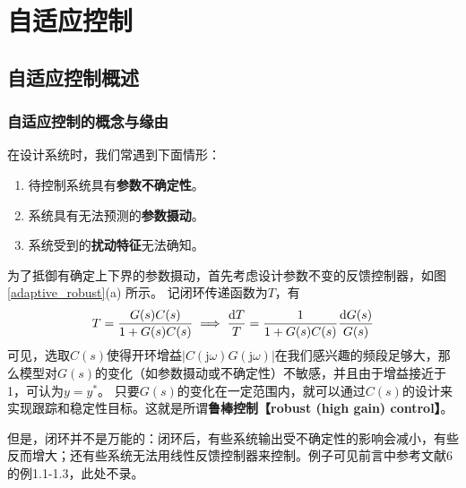 \chapter{自适应控制}\label{cp4}
\section{自适应控制概述}\label{4Aref}
\subsection{自适应控制的概念与缘由}
在设计系统时，我们常遇到下面情形：
\begin{enumerate}
  \item 待控制系统具有{\textbf{参数不确定性}}。
  
  \item 系统具有无法预测的{\textbf{参数摄动}}。
  
  \item 系统受到的{\bf 扰动特征}无法确知。
\end{enumerate}

为了抵御有确定上下界的参数摄动，首先考虑设计参数不变的反馈控制器，如图 \ref{adaptive_robust}(a) 所示。
  记闭环传递函数为$T$，有\[T=\frac{G(s)C(s)}{1+G(s)C(s)}\implies \frac{\mathop{}\!\mathrm{d} T}{T}=\frac{1}{1+G(s)C(s)}\frac{\mathop{}\!\mathrm{d} G(s)}{G(s)}\]
  可见，选取$C(s)$使得开环增益$|C(\mathrm{j}\omega)G(\mathrm{j}\omega)|$在我们感兴趣的频段足够大，那么模型对$G(s)$的变化（如参数摄动或不确定性）不敏感，并且由于增益接近于1，可认为$y=y^\ast$。
  只要$G(s)$的变化在一定范围内，就可以通过$C(s)$的设计来实现跟踪和稳定性目标。这就是所谓{\bf 鲁棒控制【robust (high gain) control】}。

但是，闭环并不是万能的：闭环后，有些系统输出受不确定性的影响会减小，有些反而增大；还有些系统无法用线性反馈控制器来控制。例子可见前言中参考文献6的例1.1-1.3，此处不录。

